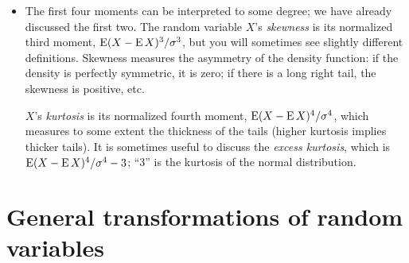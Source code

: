\begin{itemize}[leftmargin=0pt]
\item The first four moments can be interpreted to some degree; we
  have already discussed the first two.  The random variable $X$'s
  \emph{skewness} is its normalized third moment, $\operatorname{E}(X - \operatorname{E} X)^3 /
  \sigma^3$, but you will sometimes see slightly different definitions.
  Skewness measures the asymmetry of the density function: if the
  density is perfectly symmetric, it is zero; if there is a long right
  tail, the skewness is positive, etc.

  $X$'s \emph{kurtosis} is its normalized fourth moment, $\operatorname{E}(X - \operatorname{E}
  X)^4 / \sigma^4$, which measures to some extent the thickness of the tails
  (higher kurtosis implies thicker tails).  It is sometimes useful to
  discuss the \emph{excess kurtosis}, which is $\operatorname{E}(X - \operatorname{E} X)^4 / \sigma^4 -
  3$; ``$3$'' is the kurtosis of the normal distribution.

\end{itemize}

\section{General transformations of random variables}

